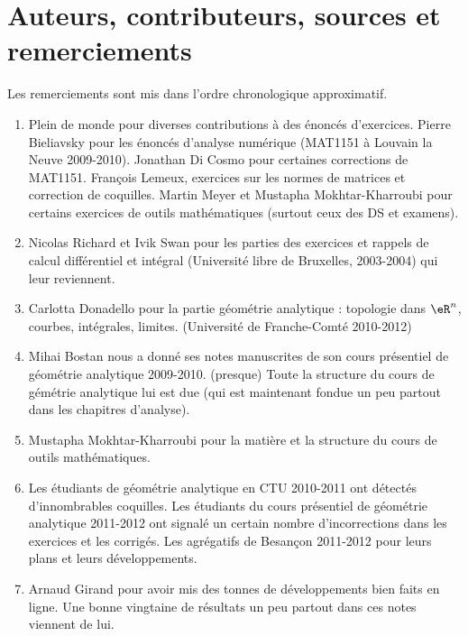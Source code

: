 \section{Auteurs, contributeurs, sources et remerciements}

Les remerciements sont mis dans l'ordre chronologique approximatif.

\begin{enumerate}
    \item
        Plein de monde pour diverses contributions à des énoncés d'exercices. Pierre Bieliavsky pour les énoncés d'analyse numérique (MAT1151 à Louvain la Neuve 2009-2010). Jonathan Di Cosmo pour certaines corrections de MAT1151. François Lemeux, exercices sur les normes de matrices et correction de coquilles. Martin Meyer et Mustapha Mokhtar-Kharroubi pour certains exercices de outils mathématiques (surtout ceux des DS et examens).
    \item
        Nicolas Richard et Ivik Swan pour les parties des exercices et rappels de calcul différentiel et intégral (Université libre de Bruxelles, 2003-2004) qui leur reviennent.
    \item 
        Carlotta Donadello pour la partie géométrie analytique : topologie dans \( \eR^n\), courbes, intégrales, limites. (Université de Franche-Comté 2010-2012)
    \item
        Mihai Bostan nous a donné ses notes manuscrites de son cours présentiel de géométrie analytique 2009-2010. (presque) Toute la structure du cours de gémétrie analytique lui est due (qui est maintenant fondue un peu partout dans les chapitres d'analyse).
    \item
         Mustapha Mokhtar-Kharroubi pour la matière et la structure du cours de outils mathématiques.
    \item
        Les étudiants de géométrie analytique en CTU 2010-2011 ont détectés d'innombrables coquilles.  Les étudiants du cours présentiel de géométrie analytique 2011-2012 ont signalé un certain nombre d'incorrections dans les exercices et les corrigés.  Les agrégatifs de Besançon 2011-2012 pour leurs plans et leurs développements.
    \item 
        Arnaud Girand pour avoir mis des tonnes de développements bien faits en ligne. Une bonne vingtaine de résultats un peu partout dans ces notes viennent de lui.

\end{enumerate}
